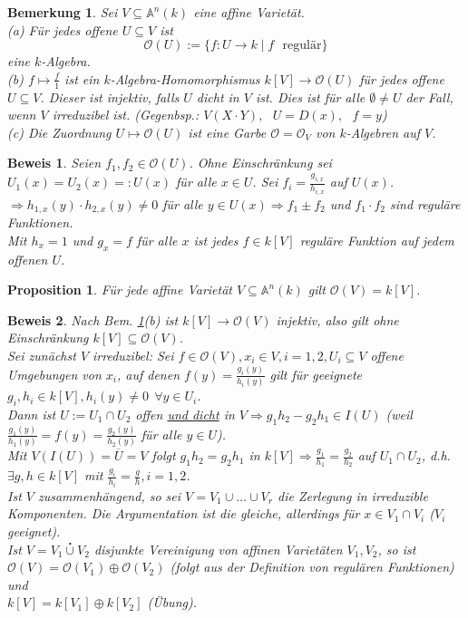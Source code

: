 \documentclass[a4paper,12pt]{report}
\theoremstyle{break}
\newtheorem{Bem}[Def]{Bemerkung}
\newtheorem{Prop}[Def]{Proposition}
\theoremstyle{nonumberbreak}
\theoremstyle{nonumberplain}
\newtheorem{Bew}{Beweis}
\begin{document}
\begin{Bem}
\label{bem:6.5}
Sei $V\subseteq \mathbb{A}^n(k)$ eine affine Varietät.\\
(a) Für jedes offene $U\subseteq V$ ist
$$\mathcal{O}(U):= \{f: U \rightarrow k \mid f \textrm{~~regulär}\}$$
eine $k$-Algebra.\\
(b) $f\mapsto \frac{f}{1}$ ist ein $k$-Algebra-Homomorphismus $k[V]\rightarrow \mathcal{O}(U)$ für jedes offene $U\subseteq V$. Dieser ist injektiv, falls $U$ dicht in $V$ ist. Dies ist für alle $\emptyset\neq U$ der Fall, wenn $V$ irreduzibel ist. (Gegenbsp.: $V(X\cdot Y), ~~~U=D(x), ~~~f=y$)\\
(c) Die Zuordnung $U\mapsto \mathcal{O}(U)$ ist eine Garbe $\mathcal{O}=\mathcal{O}_V$ von $k$-Algebren auf $V$.
\end{Bem}
\begin{Bew}
Seien $f_1,f_2\in\mathcal{O}(U)$. Ohne Einschränkung sei $U_1(x)=U_2(x)=:U(x)$ für alle $x\in U$.
Sei $f_i=\frac{g_{i,x}}{h_{i,x}}$ auf $U(x)$.\\
$\Rightarrow h_{1,x}(y)\cdot h_{2,x}(y)\neq 0$ für alle $y\in U(x) \Rightarrow f_1\pm f_2$ und $f_1\cdot f_2$ sind reguläre Funktionen.\\
Mit $h_x=1$ und $g_x=f$ für alle $x$ ist jedes $f\in k[V]$ reguläre Funktion auf jedem offenen $U$.
\end{Bew}
\begin{Prop}
\label{prop:6.6}
Für jede affine Varietät $V\subseteq\mathbb{A}^n(k)$ gilt $\mathcal{O}(V)=k[V]$.
\end{Prop}
\begin{Bew} Nach Bem. \ref{bem:6.5}(b) ist $k[V] \rightarrow \mathcal{O}(V)$ injektiv, also gilt ohne Einschränkung $k[V]\subseteq \mathcal{O}(V)$.\\
Sei zunächst $V$ irreduzibel: Sei $f\in \mathcal{O}(V), x_i\in V, i=1,2, U_i\subseteq V$ offene Umgebungen von $x_i$, auf denen $f(y)=\frac{g_i(y)}{h_i(y)}$ gilt für geeignete $g_i,h_i\in k[V], h_i(y)\neq 0 ~~\forall y\in U_i$.\\
Dann ist $U:=U_1\cap U_2$ offen \underline{und dicht} in $V \Rightarrow g_1h_2-g_2h_1\in I(U)$ (weil $\frac{g_1(y)}{h_1(y)}=f(y)=\frac{g_2(y)}{h_2(y)}$ für alle $y\in U$).\\
Mit $V(I(U))=\overline{U}=V$ folgt $g_1h_2=g_2h_1$ in $k[V]\Rightarrow \frac{g_1}{h_1}=\frac{g_2}{h_2}$ auf $U_1\cap U_2$, d.h. $\exists g,h\in k[V]$ mit $\frac{g_i}{h_i}=\frac{g}{h}, i=1,2$.\\
Ist $V$ zusammenhängend, so sei $V=V_1\cup \dots \cup V_r$ die Zerlegung in irreduzible Komponenten. Die Argumentation ist die gleiche, allerdings für $x\in V_1\cap V_i$ ($V_i$ geeignet).\\
Ist  $V=V_1\stackrel{\centerdot}{\cup} V_2$ disjunkte Vereinigung von affinen Varietäten $V_1,V_2$, so ist\\
$\mathcal{O}(V)=\mathcal{O}(V_1)\oplus\mathcal{O}(V_2)$ (folgt aus der Definition von regulären Funktionen) und\\
$k[V]=k[V_1]\oplus k[V_2]$ (Übung).
\end{Bew}
\end{document}
